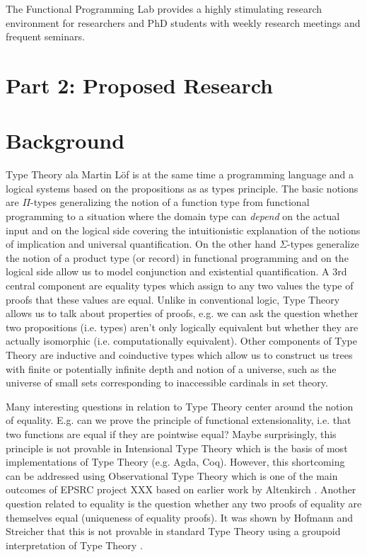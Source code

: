 \documentclass[a4paper]{article}
\begin{document}
The Functional Programming Lab provides a highly stimulating
research environment for researchers and PhD students with weekly
research meetings and frequent seminars. 



\newpage

\section*{Part 2: Proposed Research}

\section{Background}

Type Theory ala Martin L\"of is at the same time a programming
language and a logical systems based on the propositions as as types
principle. The basic notions are $\Pi$-types generalizing the notion
of a function type from functional programming to a situation where
the domain type can \emph{depend} on the actual input and on the
logical side covering the intuitionistic  explanation of the notions of 
implication and universal quantification. On the other hand
$\Sigma$-types generalize the notion of a product type (or record) in
functional programming and on the logical side allow us to model
conjunction and existential quantification. A 3rd central component are
equality types which assign to any two values the type of proofs that 
these values are equal. Unlike in conventional logic, Type Theory
allows us to talk about properties of proofs, e.g. we can ask the
question whether two propositions (i.e. types) aren't only logically
equivalent but whether they are actually isomorphic
(i.e. computationally equivalent). Other components of Type Theory are
inductive and coinductive types which allow us to construct us trees
with finite or potentially infinite depth and notion of a universe,
such as the universe of small sets corresponding to inaccessible
cardinals in set theory.

Many interesting questions in relation to Type Theory center around
the notion of equality. E.g. can we prove the principle of functional
extensionality, i.e. that two functions are equal if they are
pointwise equal? Maybe surprisingly, this principle is not provable in
Intensional Type Theory which is the basis of most implementations of
Type Theory (e.g. Agda, Coq). However, this shortcoming can be
addressed using Observational Type Theory which is one of the main
outcomes of EPSRC project XXX based on earlier work by Altenkirch
\cite{alti:lics99} . Another question related to equality is the
question whether any two proofs of equality are themselves equal
(uniqueness of equality proofs). It was shown by Hofmann and Streicher
that this is not provable in standard Type Theory using a groupoid
interpretation of Type Theory \cite{groupoid-model}.
\end{document}
